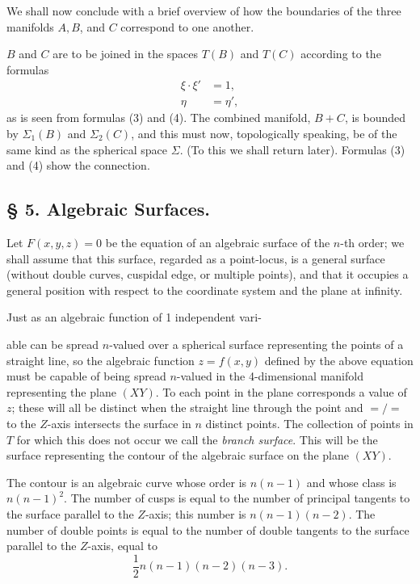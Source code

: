 \documentclass{article}
\begin{document}
We shall now conclude with a brief overview of how the boundaries of the three manifolds $A, B$, and $C$ correspond to one another.

$B$ and $C$ are to be joined in the spaces $T(B)$ and $T(C)$ according to the formulas
\[
\begin{aligned}
\xi \cdot \xi' &= 1, \\
\eta &= \eta',
\end{aligned} \tag{5}
\]
as is seen from formulas (3) and (4). The combined manifold, $B + C$, is bounded by $\Sigma_1(B)$ and $\Sigma_2(C)$, and this must now, topologically speaking, be of the same kind as the spherical space $\Sigma$. (To this we shall return later). Formulas (3) and (4) show the connection.

\subsection*{§ 5. Algebraic Surfaces.}

Let $F(x, y, z) = 0$ be the equation of an algebraic surface of the $n$-th order; we shall assume that this surface, regarded as a point-locus, is a general surface (without double curves, cuspidal edge, or multiple points), and that it occupies a general position with respect to the coordinate system and the plane at infinity.

Just as an algebraic function of 1 independent vari-

able can be spread $n$-valued over a spherical surface representing the points of a straight line, so the algebraic function $z = f(x, y)$ defined by the above equation must be capable of being spread $n$-valued in the 4-dimensional manifold representing the plane $(XY)$. To each point in the plane corresponds a value of $z$; these will all be distinct when the straight line through the point and $=/\!=$ to the $Z$-axis intersects the surface in $n$ distinct points. The collection of points in $T$ for which this does not occur we call the \emph{branch surface}. This will be the surface representing the contour of the algebraic surface on the plane $(XY)$.

The contour is an algebraic curve whose order is $n(n - 1)$ and whose class is $n(n - 1)^2$. The number of cusps is equal to the number of principal tangents to the surface parallel to the $Z$-axis; this number is $n(n - 1)(n - 2)$. The number of double points is equal to the number of double tangents to the surface parallel to the $Z$-axis, equal to
\[
\frac{1}{2} n(n - 1)(n - 2)(n - 3).
\]
\end{document}
